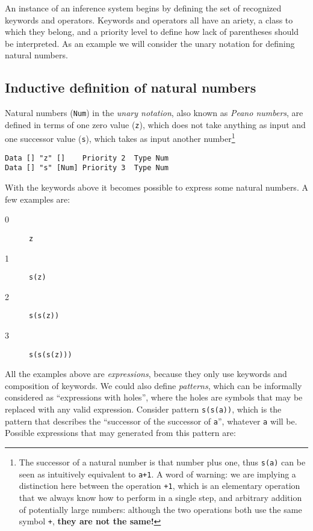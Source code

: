An instance of an inference system begins by defining the set of recognized keywords and operators. Keywords and operators all have an ariety, a class to which they belong, and a priority level to define how lack of parentheses should be interpreted. As an example we will consider the unary notation for defining natural numbers. 

\subsection{Inductive definition of natural numbers}
Natural numbers (\texttt{Num}) in the \textit{unary notation}, also known as \textit{Peano numbers}, are defined in terms of one zero value (\texttt{z}), which does not take anything as input and one successor value (\texttt{s}), which takes as input another number\footnote{The successor of a natural number is that number plus one, thus \texttt{s(a)} can be seen as intuitively equivalent to \texttt{a+1}. A word of warning: we are implying a distinction here between the operation \texttt{+1}, which is an elementary operation that we always know how to perform in a single step, and arbitrary addition of potentially large numbers: although the two operations both use the same symbol \texttt{+}, \textbf{they are not the same!}}

\begin{lstlisting}
Data [] "z" []    Priority 2  Type Num
Data [] "s" [Num] Priority 3  Type Num
\end{lstlisting}

With the keywords above it becomes possible to express some natural numbers. A few examples are:
\begin{description}
\item[0] \texttt{z}
\item[1] \texttt{s(z)}
\item[2] \texttt{s(s(z))}
\item[3] \texttt{s(s(s(z)))}
\end{description}

All the examples above are \textit{expressions}, because they only use keywords and composition of keywords. We could also define \textit{patterns}, which can be informally considered as ``expressions with holes'', where the holes are symbols that may be replaced with any valid expression. Consider pattern \texttt{s(s(a))}, which is the pattern that describes the ``successor of the successor of \texttt{a}'', whatever \texttt{a} will be. Possible expressions that may generated from this pattern are:

